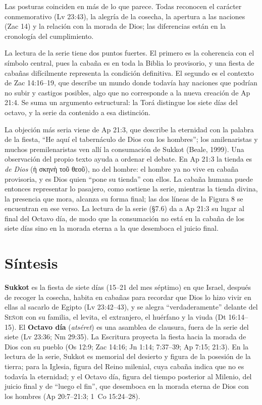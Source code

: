 \documentclass[11pt,letterpaper]{article}
\newcommand{\grc}[1]{\foreignlanguage{ancientgreek}{#1}}
\newcommand{\SENOR}{\textsc{Señor}}
\begin{document}
Las posturas coinciden en más de lo que parece. Todas reconocen el carácter conmemorativo (Lv 23:43), la alegría de la cosecha, la apertura a las naciones (Zac 14) y la relación con la morada de Dios; las diferencias están en la cronología del cumplimiento.

La lectura de la serie tiene dos puntos fuertes. El primero es la coherencia con el símbolo central, pues la cabaña es en toda la Biblia lo provisorio, y una fiesta de cabañas difícilmente representa la condición definitiva. El segundo es el contexto de Zac 14:16--19, que describe un mundo donde todavía hay naciones que podrían no subir y castigos posibles, algo que no corresponde a la nueva creación de Ap 21:4. Se suma un argumento estructural: la Torá distingue los siete días del octavo, y la serie da contenido a esa distinción.

La objeción más seria viene de Ap 21:3, que describe la eternidad con la palabra de la fiesta, ``He aquí el tabernáculo de Dios con los hombres''; los amilenaristas y muchos premilenaristas ven allí la consumación de Sukkot (Beale, 1999). Una observación del propio texto ayuda a ordenar el debate. En Ap 21:3 la tienda es \emph{de Dios} (\grc{ἡ σκηνὴ τοῦ θεοῦ}), no del hombre: el hombre ya no vive en cabaña provisoria, y es Dios quien ``pone su tienda'' con ellos. La cabaña humana puede entonces representar lo pasajero, como sostiene la serie, mientras la tienda divina, la presencia que mora, alcanza su forma final; las dos líneas de la Figura 8 se encuentran en ese verso. La lectura de la serie (§7.6) da a Ap 21:3 su lugar al final del Octavo día, de modo que la consumación no está en la cabaña de los siete días sino en la morada eterna a la que desemboca el juicio final.

\section{Síntesis}

\begin{tcolorbox}[enhanced,unbreakable,colback=papiro,colframe=tierraroja,boxrule=1pt,arc=3pt,title={\textbf{Sukkot y el Octavo día}},coltitle=papiro,colbacktitle=tierraroja]
\textbf{Sukkot} es la fiesta de siete días (15--21 del mes séptimo) en que Israel, después de recoger la cosecha, habita en cabañas para recordar que Dios lo hizo vivir en ellas al sacarlo de Egipto (Lv 23:42--43), y se alegra ``verdaderamente'' delante del \SENOR{} con su familia, el levita, el extranjero, el huérfano y la viuda (Dt 16:14--15). El \textbf{Octavo día} (\emph{atséret}) es una asamblea de clausura, fuera de la serie del siete (Lv 23:36; Nm 29:35). La Escritura proyecta la fiesta hacia la morada de Dios con su pueblo (Os 12:9; Zac 14:16; Jn 1:14; 7:37--39; Ap 7:15; 21:3). En la lectura de la serie, Sukkot es memorial del desierto y figura de la posesión de la tierra; para la Iglesia, figura del Reino milenial, cuya cabaña indica que no es todavía la eternidad; y el Octavo día, figura del tiempo posterior al Milenio, del juicio final y de ``luego el fin'', que desemboca en la morada eterna de Dios con los hombres (Ap 20:7--21:3; 1~Co 15:24--28).
\end{tcolorbox}
\end{document}
